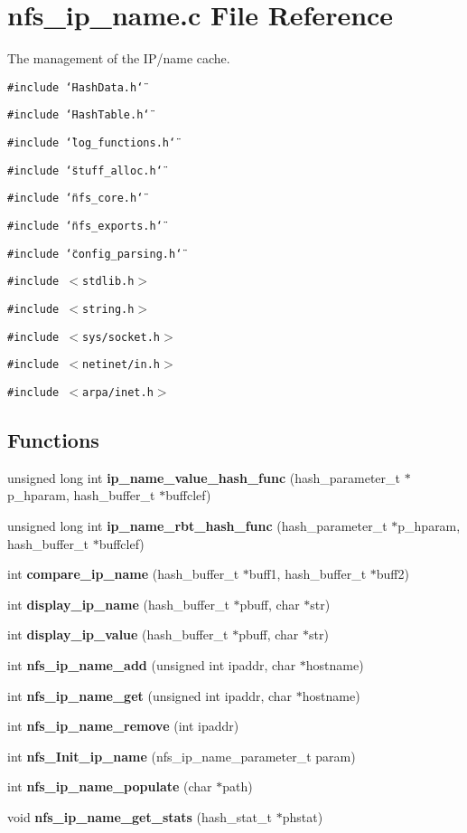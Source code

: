 \section{nfs\_\-ip\_\-name.c File Reference}
\label{nfs__ip__name_8c}
The management of the IP/name cache. 

{\tt \#include \char`\"{}Hash\-Data.h\char`\"{}}\par
{\tt \#include \char`\"{}Hash\-Table.h\char`\"{}}\par
{\tt \#include \char`\"{}log\_\-functions.h\char`\"{}}\par
{\tt \#include \char`\"{}stuff\_\-alloc.h\char`\"{}}\par
{\tt \#include \char`\"{}nfs\_\-core.h\char`\"{}}\par
{\tt \#include \char`\"{}nfs\_\-exports.h\char`\"{}}\par
{\tt \#include \char`\"{}config\_\-parsing.h\char`\"{}}\par
{\tt \#include $<$stdlib.h$>$}\par
{\tt \#include $<$string.h$>$}\par
{\tt \#include $<$sys/socket.h$>$}\par
{\tt \#include $<$netinet/in.h$>$}\par
{\tt \#include $<$arpa/inet.h$>$}\par
\subsection*{Functions}
\begin{CompactItemize}
\item 
unsigned long int {\bf ip\_\-name\_\-value\_\-hash\_\-func} (hash\_\-parameter\_\-t $\ast$p\_\-hparam, hash\_\-buffer\_\-t $\ast$buffclef)
\item 
unsigned long int {\bf ip\_\-name\_\-rbt\_\-hash\_\-func} (hash\_\-parameter\_\-t $\ast$p\_\-hparam, hash\_\-buffer\_\-t $\ast$buffclef)
\item 
int {\bf compare\_\-ip\_\-name} (hash\_\-buffer\_\-t $\ast$buff1, hash\_\-buffer\_\-t $\ast$buff2)
\item 
int {\bf display\_\-ip\_\-name} (hash\_\-buffer\_\-t $\ast$pbuff, char $\ast$str)
\item 
int {\bf display\_\-ip\_\-value} (hash\_\-buffer\_\-t $\ast$pbuff, char $\ast$str)
\item 
int {\bf nfs\_\-ip\_\-name\_\-add} (unsigned int ipaddr, char $\ast$hostname)
\item 
int {\bf nfs\_\-ip\_\-name\_\-get} (unsigned int ipaddr, char $\ast$hostname)
\item 
int {\bf nfs\_\-ip\_\-name\_\-remove} (int ipaddr)
\item 
int {\bf nfs\_\-Init\_\-ip\_\-name} (nfs\_\-ip\_\-name\_\-parameter\_\-t param)
\item 
int {\bf nfs\_\-ip\_\-name\_\-populate} (char $\ast$path)
\item 
void {\bf nfs\_\-ip\_\-name\_\-get\_\-stats} (hash\_\-stat\_\-t $\ast$phstat)
\end{CompactItemize}
